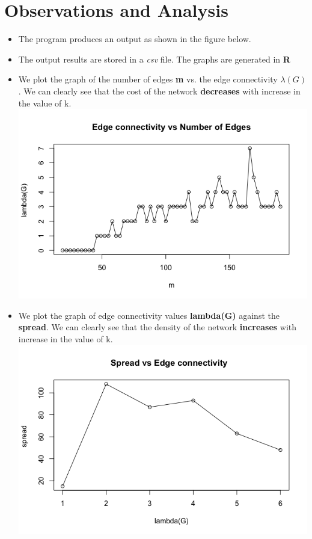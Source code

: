 \documentclass[12pt,letterpaper,titlepage,en-US]{article}
\begin{document}
\section{Observations and Analysis}
\begin{itemize}


\item The program produces an output as shown in the figure below.\\

 
\item The output results are stored in a \textit{csv} file. The graphs are generated in \textbf{R}

\item We plot the graph of the number of edges \textbf{m} vs. the edge connectivity \textbf{$\lambda(G)$}. We can clearly see that the cost of the network \textbf{decreases} with increase in the value of k. \\

\includegraphics[scale=0.7]{fig/plot1.png}

\item We plot the graph of edge connectivity values \textbf{lambda(G)} against the \textbf{spread}. We can clearly see that the density of the network \textbf{increases} with increase in the value of k. \\

\includegraphics[scale=0.6]{fig/plot2.png}





\end{itemize}
\end{document}
